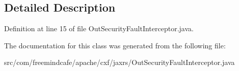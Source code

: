 \subsection{Detailed Description}


Definition at line 15 of file Out\+Security\+Fault\+Interceptor.\+java.



The documentation for this class was generated from the following file\+:\begin{DoxyCompactItemize}
\item 
src/com/freemindcafe/apache/cxf/jaxrs/Out\+Security\+Fault\+Interceptor.\+java\end{DoxyCompactItemize}
